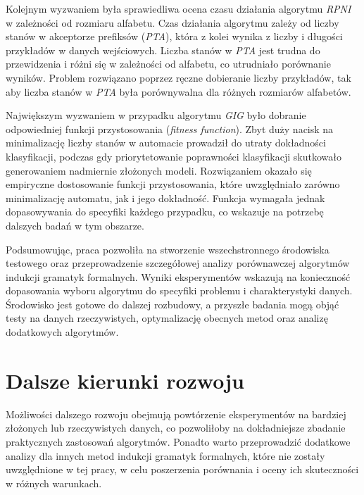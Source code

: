 Kolejnym wyzwaniem była sprawiedliwa ocena czasu działania algorytmu \textit{RPNI} w zależności od rozmiaru alfabetu. Czas działania algorytmu zależy od liczby stanów w akceptorze prefiksów (\textit{PTA}), która z kolei wynika z liczby i długości przykładów w danych wejściowych. Liczba stanów w \textit{PTA} jest trudna do przewidzenia i różni się w zależności od alfabetu, co utrudniało porównanie wyników. Problem rozwiązano poprzez ręczne dobieranie liczby przykładów, tak aby liczba stanów w \textit{PTA} była porównywalna dla różnych rozmiarów alfabetów.

Największym wyzwaniem w przypadku algorytmu \textit{GIG} było dobranie odpowiedniej funkcji przystosowania (\textit{fitness function}). Zbyt duży nacisk na minimalizację liczby stanów w automacie prowadził do utraty dokładności klasyfikacji, podczas gdy priorytetowanie poprawności klasyfikacji skutkowało generowaniem nadmiernie złożonych modeli. Rozwiązaniem okazało się empiryczne dostosowanie funkcji przystosowania, które uwzględniało zarówno minimalizację automatu, jak i jego dokładność. Funkcja wymagała jednak dopasowywania do specyfiki każdego przypadku, co wskazuje na potrzebę dalszych badań w tym obszarze.

Podsumowując, praca pozwoliła na stworzenie wszechstronnego środowiska testowego oraz przeprowadzenie szczegółowej analizy porównawczej algorytmów indukcji gramatyk formalnych. Wyniki eksperymentów wskazują na konieczność dopasowania wyboru algorytmu do specyfiki problemu i charakterystyki danych. Środowisko jest gotowe do dalszej rozbudowy, a przyszłe badania mogą objąć testy na danych rzeczywistych, optymalizację obecnych metod oraz analizę dodatkowych algorytmów.


\section{Dalsze kierunki rozwoju}
Możliwości dalszego rozwoju obejmują powtórzenie eksperymentów na bardziej złożonych lub rzeczywistych danych, co pozwoliłoby na dokładniejsze zbadanie praktycznych zastosowań algorytmów. Ponadto warto przeprowadzić dodatkowe analizy dla innych metod indukcji gramatyk formalnych, które nie zostały uwzględnione w tej pracy, w celu poszerzenia porównania i oceny ich skuteczności w różnych warunkach.

